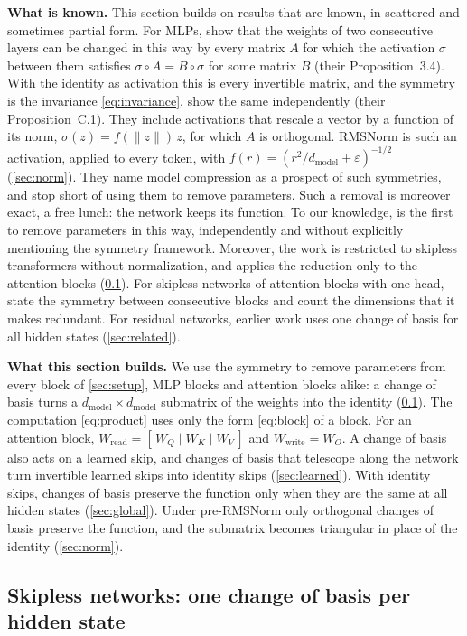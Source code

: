 \documentclass[10pt]{article}
\theoremstyle{definition}
\theoremstyle{remark}
\newcommand{\Wread}{W_{\mathrm{read}}}
\newcommand{\Wwrite}{W_{\mathrm{write}}}
\newcommand{\dm}{d_{\mathrm{model}}}
\newcommand{\norm}[1]{\lVert #1\rVert}
\newcommand{\para}[1]{\smallskip\noindent\textbf{#1}\hspace{0.5em}}
\begin{document}
\para{What is known.} This section builds on results that are known, in scattered and sometimes partial form. For MLPs, \citet{godfrey2022symmetries} show that the weights of two consecutive layers can be changed in this way by every matrix $A$ for which the activation $\sigma$ between them satisfies $\sigma \circ A = B \circ \sigma$ for some matrix $B$ (their Proposition~3.4). With the identity as activation this is every invertible matrix, and the symmetry is the invariance \eqref{eq:invariance}. \citet{zhao2023symmetries} show the same independently (their Proposition~C.1). They include activations that rescale a vector by a function of its norm, $\sigma(z) = f(\norm{z})\,z$, for which $A$ is orthogonal. RMSNorm is such an activation, applied to every token, with $f(r) = (r^2/\dm + \varepsilon)^{-1/2}$ (\cref{sec:norm}). They name model compression as a prospect of such symmetries, and stop short of using them to remove parameters. Such a removal is moreover exact, a free lunch: the network keeps its function. To our knowledge, \citet{graef2024tricks} is the first to remove parameters in this way, independently and without explicitly mentioning the symmetry framework. Moreover, the work is restricted to skipless transformers without normalization, and applies the reduction only to the attention blocks (\cref{sec:skipless}). For skipless networks of attention blocks with one head, \citet{henry2025lightning} state the symmetry between consecutive blocks and count the dimensions that it makes redundant. For residual networks, earlier work uses one change of basis for all hidden states (\cref{sec:related}).

\para{What this section builds.} We use the symmetry to remove parameters from every block of \cref{sec:setup}, MLP blocks and attention blocks alike: a change of basis turns a $\dm\times\dm$ submatrix of the weights into the identity (\cref{sec:skipless}). The computation \eqref{eq:product} uses only the form \eqref{eq:block} of a block. For an attention block, $\Wread = [\,W_Q \mid W_K \mid W_V\,]$ and $\Wwrite = W_O$. A change of basis also acts on a learned skip, and changes of basis that telescope along the network turn invertible learned skips into identity skips (\cref{sec:learned}). With identity skips, changes of basis preserve the function only when they are the same at all hidden states (\cref{sec:global}). Under pre-RMSNorm only orthogonal changes of basis preserve the function, and the submatrix becomes triangular in place of the identity (\cref{sec:norm}).

\subsection{Skipless networks: one change of basis per hidden state}\label{sec:skipless}\label{sec:junctions}
\end{document}

